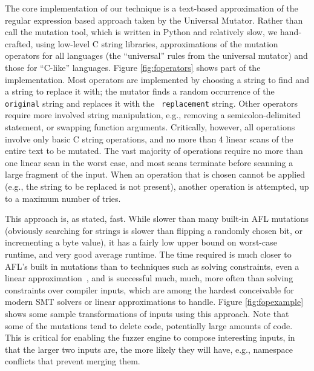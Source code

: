\begin{sloppypar}
The core implementation of our technique is a text-based approximation
of the regular expression based approach taken by the Universal
Mutator.  Rather than call the mutation tool, which is written in
Python and relatively slow, we hand-crafted, using low-level C string
libraries, approximations of the mutation operators for all languages
(the ``universal'' rules from the universal mutator) and those for
``C-like'' languages.  Figure \ref{fig:foperators} shows part of the
implementation.  Most operators are implemented by choosing a string
to find and a string to replace it with; the mutator finds a random
occurrence of the {\tt original} string and replaces it with the {\tt
  replacement} string.  Other operators require more involved string
manipulation, e.g., removing a semicolon-delimited statement, or
swapping function arguments.  Critically, however, all operations
involve only basic C string operations, and no more than 4 linear
scans of the entire text to be mutated.  The vast majority of operations require no
more than one linear scan in the worst case, and most scans terminate
before scanning a large fragment of the input.  When an operation that
is chosen cannot be applied (e.g., the string to be replaced is not
present), another operation is attempted, up to a maximum number of
tries.

\end{sloppypar}

This approach is, as stated, fast.  While slower than many built-in
AFL mutations (obviously searching for strings is slower than flipping
a randomly chosen bit, or incrementing a byte value), it has a fairly
low upper bound on worst-case runtime, and very good average runtime.  The time required is much
closer to AFL's built in mutations than to techniques such as
solving constraints, even a linear
approximation~\cite{Eclipser}, and is successful much, much, more
often than solving constraints over compiler inputs, which are among
the hardest conceivable for modern SMT solvers or linear
approximations to handle.  Figure \ref{fig:fopexample} shows some
sample transformations of inputs using this approach.  Note that
some of the mutations tend to delete code, potentially large amounts
of code.  This is critical for enabling the fuzzer engine to compose
interesting inputs, in that the larger two inputs are, the
more likely they will have, e.g., namespace conflicts that prevent
merging them.

